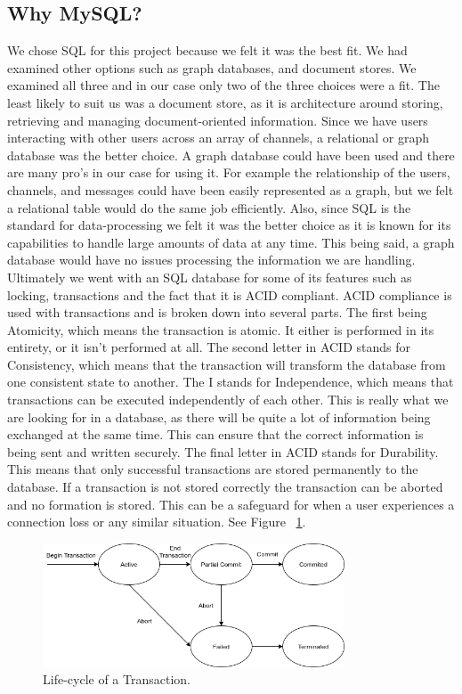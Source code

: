 \subsection{Why MySQL?}
We chose SQL for this project because we felt it was the best fit. We had examined other options such as graph databases, and document stores. We examined all three and in our case only two of the three choices were a fit. The least likely to suit us was a document store, as it is architecture around storing, retrieving and managing document-oriented information. Since we have users interacting with other users across an array of channels, a relational or graph database was the better choice.  A graph database could have been used and there are many pro’s in our case for using it. For example the relationship of the users, channels, and messages could have been easily represented as a graph, but we felt a relational table would do the same job efficiently. Also, since SQL is the standard for data-processing we felt it was the better choice as it is known for its capabilities to handle large amounts of data at any time. This being said, a graph database would have no issues processing the information we are handling. Ultimately we went with an SQL database for some of its features such as locking, transactions and the fact that it is ACID compliant. ACID compliance is used with transactions and is broken down into several parts. The first being Atomicity, which means the transaction is atomic. It either is performed in its entirety, or it isn’t performed at all. The second letter in ACID stands for Consistency, which means that the transaction will transform the database from one consistent state to another. The I stands for Independence, which means that transactions can be executed independently of each other. This is really what we are looking for in a database, as there will be quite a lot of information being exchanged at the same time. This can ensure that the correct information is being sent and written securely. The final letter in ACID stands for Durability. This means that only successful transactions are stored permanently to the database. If a transaction is not stored correctly the transaction can be aborted and no formation is stored. This can be a safeguard for when a user experiences a connection loss or any similar situation. See Figure ~\ref{image:txLifeCycle}.

\begin{figure}[h!]
    \caption{Life-cycle of a Transaction.}
    \label{image:txLifeCycle}
    \centering
    \includegraphics[width=0.8\textwidth]{images/TransactionLifeCycle_ACID.png}
\end{figure}

